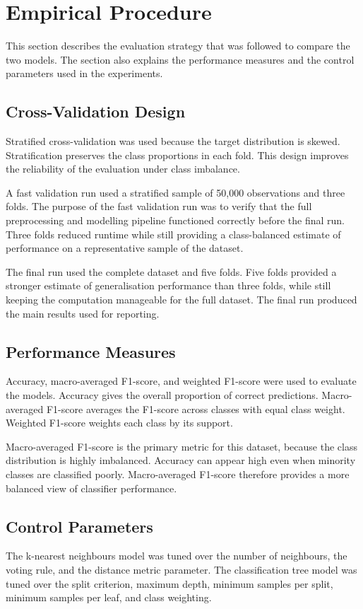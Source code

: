 \documentclass[conference,10pt]{IEEEtran}
\begin{document}
\section{Empirical Procedure}
This section describes the evaluation strategy that was followed to compare the two models. The section also explains the performance measures and the control parameters used in the experiments.

\subsection{Cross-Validation Design}
Stratified cross-validation was used because the target distribution is skewed. Stratification preserves the class proportions in each fold. This design improves the reliability of the evaluation under class imbalance.

A fast validation run used a stratified sample of 50,000 observations and three folds. The purpose of the fast validation run was to verify that the full preprocessing and modelling pipeline functioned correctly before the final run. Three folds reduced runtime while still providing a class-balanced estimate of performance on a representative sample of the dataset.

The final run used the complete dataset and five folds. Five folds provided a stronger estimate of generalisation performance than three folds, while still keeping the computation manageable for the full dataset. The final run produced the main results used for reporting.

\subsection{Performance Measures}
Accuracy, macro-averaged F1-score, and weighted F1-score were used to evaluate the models. Accuracy gives the overall proportion of correct predictions. Macro-averaged F1-score averages the F1-score across classes with equal class weight. Weighted F1-score weights each class by its support.

Macro-averaged F1-score is the primary metric for this dataset, because the class distribution is highly imbalanced. Accuracy can appear high even when minority classes are classified poorly. Macro-averaged F1-score therefore provides a more balanced view of classifier performance.

\subsection{Control Parameters}
The k-nearest neighbours model was tuned over the number of neighbours, the voting rule, and the distance metric parameter. The classification tree model was tuned over the split criterion, maximum depth, minimum samples per split, minimum samples per leaf, and class weighting.
\end{document}
